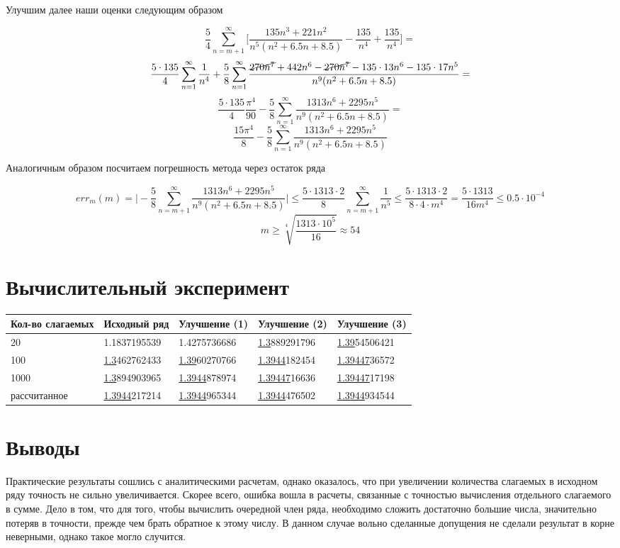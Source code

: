 \documentclass[11pt,a4paper,oneside]{article}
\begin{document}
Улучшим далее наши оценки следующим образом

$$ \frac{5}{4} \sum_{n = m + 1}^{\infty}
	\biggr[ \frac{135 n^3 + 221 n^2}{n^5 (n^2 + 6.5n + 8.5)} - 
	\frac{135}{n^4} + \frac{135}{n^4} \biggr] =$$
$$ \frac{5 \cdot 135}{4} \sum_{n = 1}^{\infty} \frac{1}{n^4} +
	\frac{5}{8} \sum_{n = 1}^{\infty}
	\frac{\cancel{270 n^7} + 442 n^6 - \cancel{270 n^7} -
		135 \cdot 13 n^6 - 135 \cdot 17 n^5}{n^9 (n^2 + 6.5n + 8.5)} = $$
$$ \frac{5 \cdot 135}{4} \frac{\pi^4}{90} -
	\frac{5}{8} \sum_{n = 1}^{\infty}
	\frac{1313 n^6 + 2295 n^5}{n^9 (n^2 + 6.5n + 8.5)} = $$
$$ \frac{15 \pi^4}{8} -
	\frac{5}{8} \sum_{n = 1}^{\infty}
	\frac{1313 n^6 + 2295 n^5}{n^9 (n^2 + 6.5n + 8.5)} $$

Аналогичным образом посчитаем погрешность метода через остаток ряда

$$ err_{m}(m) =
	\biggr| - \frac{5}{8} \sum_{n = m + 1}^{\infty}
		\frac{1313 n^6 + 2295 n^5}{n^9 (n^2 + 6.5n + 8.5)} \biggr| \le
	\frac{5 \cdot 1313 \cdot 2}{8} \sum_{n = m + 1}^{\infty} \frac{1}{n^5} \le
	\frac{5 \cdot 1313 \cdot 2}{8 \cdot 4 \cdot m^4} = 
	\frac{5 \cdot 1313}{16 m^4} \le 0.5 \cdot 10^{-4} $$
$$ m \ge \sqrt[4]{ \frac{1313 \cdot 10^{5}}{16} } \approx 54 $$

\section{Вычислительный эксперимент}

\begin{tabular}{ | l | l | l | l | l | }
	\hline
	Кол-во слагаемых
		& Исходный ряд
		& Улучшение (1)
		& Улучшение (2)
		& Улучшение (3) \\ \hline
	20
		& 1.1837195539
		& 1.4275736686
		& \underline{1.3}889291796
		& \underline{1.39}54506421 \\ \hline
	100 
		& \underline{1.3}462762433
		& \underline{1.39}60270766
		& \underline{1.3944}182454
		& \underline{1.39447}36572 \\ \hline
	1000
		& \underline{1.3}894903965
		& \underline{1.3944}878974
		& \underline{1.39447}16636
		& \underline{1.39447}17198 \\ \hline
	рассчитанное
		& \underline{1.3944}217214
		& \underline{1.3944}965344
		& \underline{1.3944}476502
		& \underline{1.3944}934544 \\ \hline
\end{tabular}

\section{Выводы}

Практические результаты сошлись с аналитическими расчетам, однако оказалось, что при увеличении количества слагаемых в исходном ряду точность не сильно увеличивается. Скорее всего, ошибка вошла в расчеты, связанные с точностью вычисления отдельного слагаемого в сумме. Дело в том, что для того, чтобы вычислить очередной член ряда, необходимо сложить достаточно большие числа, значительно потеряв в точности, прежде чем брать обратное к этому числу. В данном случае вольно сделанные допущения не сделали результат в корне неверными, однако такое могло случится.
\end{document}
